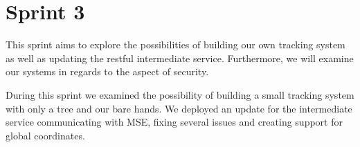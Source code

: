 \chapter{Sprint 3}\label{cha:sprint3}
This sprint aims to explore the possibilities of building our own tracking system as well as updating the restful intermediate service. Furthermore, we will examine our systems in regards to the aspect of security. 



During this sprint we examined the possibility of building a small tracking system with only a tree and our bare hands. We deployed an update for the intermediate service communicating with MSE, fixing several issues and creating support for global coordinates. 